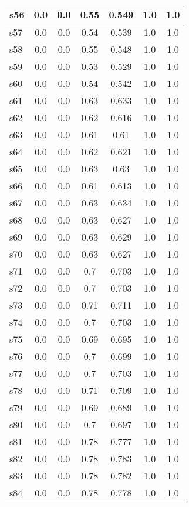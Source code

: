 \documentclass{article}
\begin{document}
\begin{tabular}{|l|c|c|c|c|c|c|}
\hline
s56 &0.0 & 0.0 & 0.55 & 0.549 & 1.0 & 1.0\\
\hline
s57 &0.0 & 0.0 & 0.54 & 0.539 & 1.0 & 1.0\\
\hline
s58 &0.0 & 0.0 & 0.55 & 0.548 & 1.0 & 1.0\\
\hline
s59 &0.0 & 0.0 & 0.53 & 0.529 & 1.0 & 1.0\\
\hline
s60 &0.0 & 0.0 & 0.54 & 0.542 & 1.0 & 1.0\\
\hline
s61 &0.0 & 0.0 & 0.63 & 0.633 & 1.0 & 1.0\\
\hline
s62 &0.0 & 0.0 & 0.62 & 0.616 & 1.0 & 1.0\\
\hline
s63 &0.0 & 0.0 & 0.61 & 0.61 & 1.0 & 1.0\\
\hline
s64 &0.0 & 0.0 & 0.62 & 0.621 & 1.0 & 1.0\\
\hline
s65 &0.0 & 0.0 & 0.63 & 0.63 & 1.0 & 1.0\\
\hline
s66 &0.0 & 0.0 & 0.61 & 0.613 & 1.0 & 1.0\\
\hline
s67 &0.0 & 0.0 & 0.63 & 0.634 & 1.0 & 1.0\\
\hline
s68 &0.0 & 0.0 & 0.63 & 0.627 & 1.0 & 1.0\\
\hline
s69 &0.0 & 0.0 & 0.63 & 0.629 & 1.0 & 1.0\\
\hline
s70 &0.0 & 0.0 & 0.63 & 0.627 & 1.0 & 1.0\\
\hline
s71 &0.0 & 0.0 & 0.7 & 0.703 & 1.0 & 1.0\\
\hline
s72 &0.0 & 0.0 & 0.7 & 0.703 & 1.0 & 1.0\\
\hline
s73 &0.0 & 0.0 & 0.71 & 0.711 & 1.0 & 1.0\\
\hline
s74 &0.0 & 0.0 & 0.7 & 0.703 & 1.0 & 1.0\\
\hline
s75 &0.0 & 0.0 & 0.69 & 0.695 & 1.0 & 1.0\\
\hline
s76 &0.0 & 0.0 & 0.7 & 0.699 & 1.0 & 1.0\\
\hline
s77 &0.0 & 0.0 & 0.7 & 0.703 & 1.0 & 1.0\\
\hline
s78 &0.0 & 0.0 & 0.71 & 0.709 & 1.0 & 1.0\\
\hline
s79 &0.0 & 0.0 & 0.69 & 0.689 & 1.0 & 1.0\\
\hline
s80 &0.0 & 0.0 & 0.7 & 0.697 & 1.0 & 1.0\\
\hline
s81 &0.0 & 0.0 & 0.78 & 0.777 & 1.0 & 1.0\\
\hline
s82 &0.0 & 0.0 & 0.78 & 0.783 & 1.0 & 1.0\\
\hline
s83 &0.0 & 0.0 & 0.78 & 0.782 & 1.0 & 1.0\\
\hline
s84 &0.0 & 0.0 & 0.78 & 0.778 & 1.0 & 1.0\\

\end{tabular}
\end{document}
